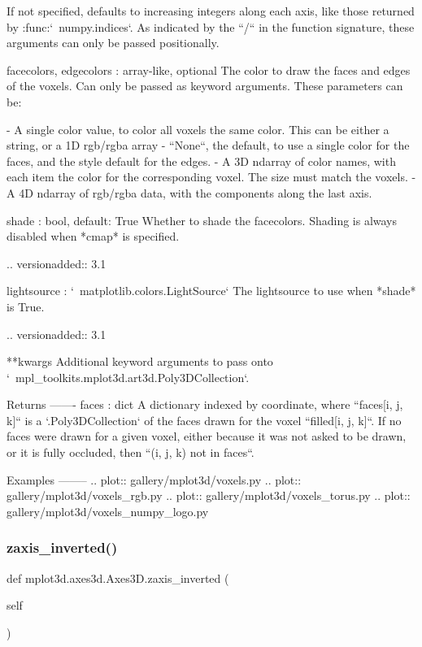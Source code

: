 \begin{DoxyVerb}
\begin{DoxyVerb}
    If not specified, defaults to increasing integers along each axis,
    like those returned by :func:`~numpy.indices`.
    As indicated by the ``/`` in the function signature, these
    arguments can only be passed positionally.

facecolors, edgecolors : array-like, optional
    The color to draw the faces and edges of the voxels. Can only be
    passed as keyword arguments.
    These parameters can be:

    - A single color value, to color all voxels the same color. This
      can be either a string, or a 1D rgb/rgba array
    - ``None``, the default, to use a single color for the faces, and
      the style default for the edges.
    - A 3D ndarray of color names, with each item the color for the
      corresponding voxel. The size must match the voxels.
    - A 4D ndarray of rgb/rgba data, with the components along the
      last axis.

shade : bool, default: True
    Whether to shade the facecolors.  Shading is always disabled when
    *cmap* is specified.

    .. versionadded:: 3.1

lightsource : `~matplotlib.colors.LightSource`
    The lightsource to use when *shade* is True.

    .. versionadded:: 3.1

**kwargs
    Additional keyword arguments to pass onto
    `~mpl_toolkits.mplot3d.art3d.Poly3DCollection`.

Returns
-------
faces : dict
    A dictionary indexed by coordinate, where ``faces[i, j, k]`` is a
    `.Poly3DCollection` of the faces drawn for the voxel
    ``filled[i, j, k]``. If no faces were drawn for a given voxel,
    either because it was not asked to be drawn, or it is fully
    occluded, then ``(i, j, k) not in faces``.

Examples
--------
.. plot:: gallery/mplot3d/voxels.py
.. plot:: gallery/mplot3d/voxels_rgb.py
.. plot:: gallery/mplot3d/voxels_torus.py
.. plot:: gallery/mplot3d/voxels_numpy_logo.py
\end{DoxyVerb}
 \mbox{\label{classmplot3d_1_1axes3d_1_1Axes3D_ae332252730d8e20553a41721dbe2fb73}} 
\subsubsection{\texorpdfstring{zaxis\+\_\+inverted()}{zaxis\_inverted()}}
{\footnotesize\ttfamily def mplot3d.\+axes3d.\+Axes3\+D.\+zaxis\+\_\+inverted (\begin{DoxyParamCaption}\item[{}]{self }\end{DoxyParamCaption})}


\end{DoxyVerb}
